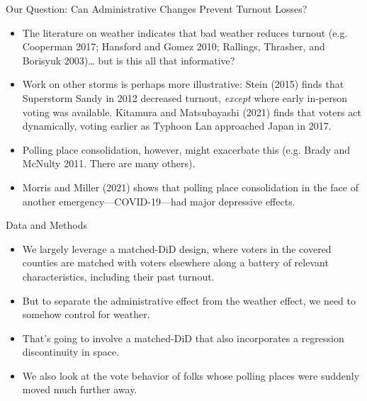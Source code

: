 \documentclass[
  ignorenonframetext,
  aspectratio=169]{beamer}
\providecommand{\tightlist}{%
  \setlength{\itemsep}{0pt}\setlength{\parskip}{0pt}}
\begin{document}
\begin{frame}{Our Question: Can Administrative Changes Prevent Turnout
Losses?}
\protect\hypertarget{our-question-can-administrative-changes-prevent-turnout-losses}{}
\begin{itemize}[<+->]
\tightlist
\item
  The literature on weather indicates that bad weather reduces turnout
  (e.g. Cooperman 2017; Hansford and Gomez 2010; Rallings, Thrasher, and
  Borisyuk 2003)\ldots{} but is this all that informative?
\end{itemize}

\begin{itemize}[<+->]
\tightlist
\item
  Work on other storms is perhaps more illustrative: Stein (2015) finds
  that Superstorm Sandy in 2012 decreased turnout, \emph{except} where
  early in-person voting was available. Kitamura and Matsubayashi (2021)
  finds that voters act dynamically, voting earlier as Typhoon Lan
  approached Japan in 2017.
\end{itemize}

\begin{itemize}[<+->]
\tightlist
\item
  Polling place consolidation, however, might exacerbate this (e.g.
  Brady and McNulty 2011. There are many others).
\end{itemize}

\begin{itemize}[<+->]
\tightlist
\item
  Morris and Miller (2021) shows that polling place consolidation in the
  face of another emergency---COVID-19---had major depressive effects.
\end{itemize}
\end{frame}

\begin{frame}{Data and Methods}
\protect\hypertarget{data-and-methods}{}
\begin{itemize}[<+->]
\tightlist
\item
  We largely leverage a matched-DiD design, where voters in the covered
  counties are matched with voters elsewhere along a battery of relevant
  characteristics, including their past turnout.
\item
  But to separate the administrative effect from the weather effect, we
  need to somehow control for weather.
\item
  That's going to involve a matched-DiD that also incorporates a
  regression discontinuity in space.
\item
  We also look at the vote behavior of folks whose polling places were
  suddenly moved much further away.
\end{itemize}
\end{frame}
\end{document}
